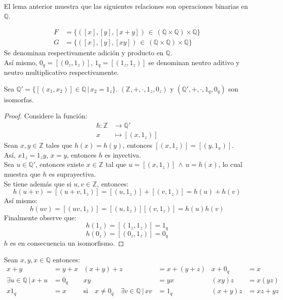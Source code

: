 El lema anterior muestra que las siguientes relaciones son operaciones binarias
en $\mathbb{Q}$.
\begin{definition}
  \begin{align*}
    F &= \{([x],[y], [x+y]) \, \in \, (\mathbb{Q} \times\mathbb{Q})\times
    \mathbb{Q}\} \\
    G &= \{([x],[y], [xy]) \, \in \, (\mathbb{Q} \times\mathbb{Q})\times
    \mathbb{Q}\}
  \end{align*}
  Se denominan respectivamente adición y producto en $\mathbb{Q}$.\\
  Así mismo, $0_q = [(0_z,1_z)]$, $1_q=[(1_z,1_z)]$ se denominan neutro aditivo y
  neutro multiplicativo respectivamente.
\end{definition}
\begin{proposition*}
  Sea $\mathbb{Q}' = \{[(x_1,x_2)] \in \mathbb{Q} \, |\, x_2 = 1_z \}$.
  $(\mathbb{Z}, +, \cdot, 1_z, 0_z)$ y $(\mathbb{Q}', +, \cdot, 1_q, 0_q)$ son
  isomorfas.
\end{proposition*}
\begin{proof}
  Considere la función:
  \begin{align*}
    h:\mathbb{Z} &\to  \mathbb{Q}' \\
    x &\mapsto [(x, 1_z)]
  \end{align*}
  Sean $x, y \in \mathbb{Z}$ tales que $h(x) = h(y)$, entonces
  $[(x,1_z)]=[(y,1_x)]$.\\
  Así, $x1_z = 1_zy$, $x = y$, entonces $h$ es inyectiva.\\
  Sea $u \in \mathbb{Q}'$, entonces existe $x\in \mathbb{Z}$ tal que $u =
  [(x,1_z)] \, \land \, u = h(x)$, lo cual muestra que $h$ es suprayectiva. \\
  Se tiene además que si $u,v \in \mathbb{Z}$, entonces:
  \[
    h(u+v) = [(u+v, 1_z)] = [(u, 1_z)] + [(v, 1_z)] = h(u) + h(v)
  \]
  Así mismo:
  \[
    h(uv) = [(uv, 1_z)] = [(u, 1_z)]  [(v, 1_z)] = h(u)  h(v)
  \]
  Finalmente observe que:
  \[
    h(1_z) = [(1_z,1_z)] = 1_q
  \]
  \[
    h(0_z) = [(0_z, 1_z)] =0_q
  \]
  $h$ es en consecuencia un isomorfismo.
\end{proof}
\begin{proposition}\label{prop:37}
  Sean $x,y,x \in \mathbb{Q}$ entonces:
  \begin{align*}
    x+y &= y+x & (x+y)+z &= x+(y+z) & x +0_q &= x \\
    \exists u \in \mathbb{Q} \, | \, x+ u &= 0_q & xy &= yx & (xy)z &= x(yz)
    \\
    x1_q &= x & \mathrm{si} \quad x \neq0_q \quad \exists v \in \mathbb{Q} \, | \, xv
         &= 1_q & (x+y)z &= xz + yz
  \end{align*}
\end{proposition}
